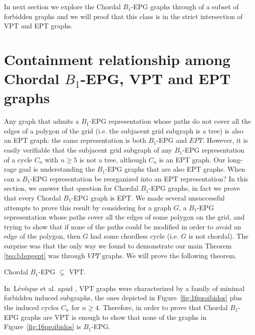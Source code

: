 \documentclass{dmgt}
\begin{document}
In next section we explore the Chordal $B_1$-EPG graphs through of a subset of forbidden graphs and we will proof that this class is in the strict intersection of VPT and EPT graphs.



\section{Containment relationship among Chordal $B_1$-EPG, VPT and EPT graphs }


 Any graph that
admits a $B_1$-EPG representation  whose paths do not cover all the edges of a polygon of the grid (i.e.
the subjacent grid subgraph is a tree)  is also an EPT graph: the same representation is both $B_1$-EPG and $EPT$.
However, it is easily verifiable that the subjacent grid subgraph of any $B_1$-EPG representation of a cycle $C_n$ with $n\geq 5$ is not a tree,
although $C_n$ is an  EPT graph.  Our long-rage goal is 
understanding the $B_1$-EPG graphs that are also EPT graphs. When can a $B_1$-EPG representation
be reorganized into an EPT representation?  In this section,
 we answer that question for Chordal $B_1$-EPG graphs, in fact we prove that every Chordal $B_1$-EPG graph is EPT. We
 made several unsuccessful attempts to prove this result by considering for a graph $G$, a $B_1$-EPG representation whose paths cover all the edges
 of some polygon on the grid, and trying  to show  that if none of the paths could be modified in order to avoid an edge of the polygon,
 then $G$ had some chordless  cycle (i.e. $G$ is not chordal). The surprise was that the only way we found to demonstrate our main Theorem \ref{teo:b1epgept} was through $VPT$ graphs.
 We will prove the following theorem.

\begin{theorem}\label{teo:chordalB1inVPT}
Chordal $B_1$-EPG $\subsetneq$ VPT. 
\end{theorem}

In~L{\'e}v{\^e}que et al. \cite{leveque2009characterizing} apud \cite{alcon2015characterizing},  VPT graphs were characterized by a family of minimal forbidden induced subgraphs,
the ones depicted in 
Figure~\ref{fig:16proibidos} plus the induced cycles $C_n$ for $n\geq 4$. Therefore, in order to prove
that Chordal $B_1$-EPG graphs are VPT is enough to show that none of the graphs in Figure~\ref{fig:16proibidos} 
is $B_1$-EPG. %
\end{document}
